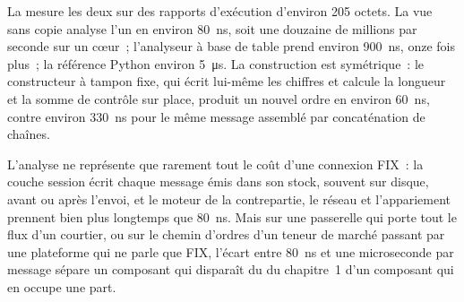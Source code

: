 La  mesure les deux sur des rapports d'exécution d'environ 205 octets. La vue sans copie analyse l'un en
environ \qty{80}{\nano\second}, soit une douzaine de millions par seconde sur un cœur~; l'analyseur à base de table prend environ \qty{900}{\nano\second},
onze fois plus~; la référence Python environ \qty{5}{\micro\second}. La construction est symétrique~: le constructeur à tampon fixe, qui écrit lui-même les chiffres
et calcule la longueur et la somme de contrôle sur place, produit un nouvel ordre en environ \qty{60}{\nano\second}, contre environ
\qty{330}{\nano\second} pour le même message assemblé par concaténation de chaînes.

\begin{omfigure}

\label{fig:ll:protocols-i-fix:parse}
\end{omfigure}

L'analyse ne représente que rarement tout le coût d'une connexion FIX~: la couche session écrit chaque message émis dans son stock, souvent sur disque,
avant ou après l'envoi, et le moteur de la contrepartie, le réseau et l'appariement prennent bien plus longtemps que \qty{80}{\nano\second}.
Mais sur une passerelle qui porte tout le flux d'un courtier, ou sur le chemin d'ordres d'un teneur de marché passant par une plateforme qui ne parle que FIX,
l'écart entre \qty{80}{\nano\second} et une microseconde par message sépare un composant qui disparaît du  du chapitre~1
d'un composant qui en occupe une part.


